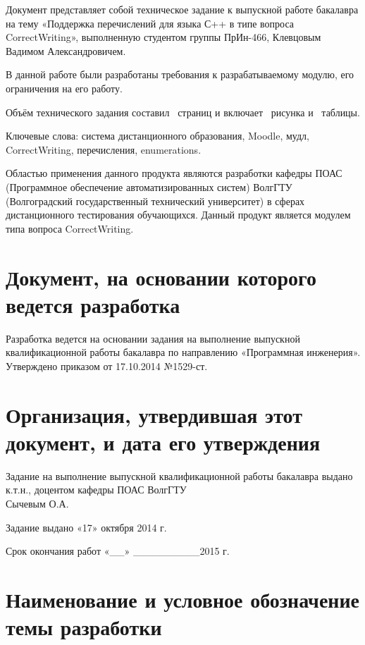\documentclass[a4paper,english]{G2-105}
\begin{document}
\par Документ представляет собой техническое задание к выпускной работе бакалавра на тему «Поддержка перечислений для языка С++ в типе вопроса CorrectWriting», выполненную студентом группы ПрИн-466, Клевцовым Вадимом Александровичем.
\par В данной работе были разработаны требования к разрабатываемому модулю, его ограничения на его работу.
\par Объём технического задания составил \totalpages~страниц и включает \totalfigures~рисунка и \totaltables~таблицы. 
\par Ключевые слова: система дистанционного образования, Moodle, мудл, CorrectWriting, перечисления, enumerations.
\VSTUInitializeTZ
\tableofcontents
\newpage


\par Областью применения данного продукта являются разработки кафедры ПОАС (Программное
обеспечение автоматизированных систем) ВолгГТУ (Волгоградский государственный
технический университет) в сферах дистанционного тестирования обучающихся. 
Данный продукт является модулем типа вопроса CorrectWriting. 

\ttl
\section{Документ, на основании которого ведется разработка}
\par Разработка ведется на основании задания на выполнение выпускной квалификационной работы бакалавра по направлению «Программная инженерия». Утверждено приказом от 17.10.2014 №1529-ст.
\section{Организация, утвердившая этот документ, и дата его утверждения}
\par Задание на выполнение выпускной квалификационной работы бакалавра выдано к.т.н., доцентом кафедры ПОАС ВолгГТУ \\ Сычевым О.А. 
\par Задание выдано «17» октября 2014 г.
\par Срок окончания работ «\_\_» \_\_\_\_\_\_\_\_\_2015 г.
\section{Наименование и условное обозначение темы разработки}
\end{document}
